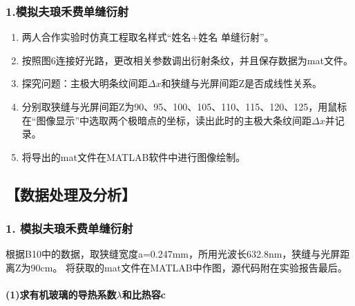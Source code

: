 \documentclass[12pt,a4paper,UTF8]{ctexart}
\begin{document}
	\subsubsection*{1.模拟夫琅禾费单缝衍射}
	\begin{enumerate}[(1)]
			\item 两人合作实验时仿真工程取名样式“姓名+姓名 单缝衍射”。
			\item 按照图6连接好光路，更改相关参数调出衍射条纹，并且保存数据为mat文件。
			\item 探究问题：主极大明条纹间距$\Delta x$和狭缝与光屏间距Z是否成线性关系。
			\item 分别取狭缝与光屏间距Z为90、95、100、105、110、115、120、125，用鼠标在“图像显示”中选取两个极暗点的坐标，读出此时的主极大条纹间距$\Delta x$并记录。
			\item 将导出的mat文件在MATLAB软件中进行图像绘制。
	\end{enumerate}


\subsection*{【数据处理及分析】}
	\subsubsection*{1. 模拟夫琅禾费单缝衍射}
	根据B10中的数据，取狭缝宽度a=0.247mm，所用光波长632.8nm，狭缝与光屏距离Z为90cm。
	将获取的mat文件在MATLAB中作图，源代码附在实验报告最后。

	\paragraph{(1)求有机玻璃的导热系数$\lambda$和比热容c}

\end{document}
